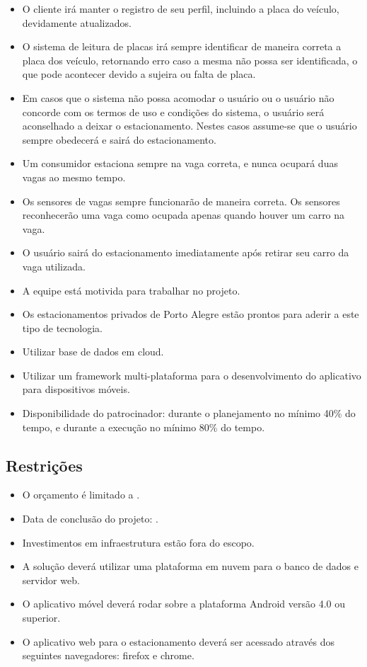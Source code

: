 \begin{itemize}
	\item O cliente irá manter o registro de seu perfil, incluindo a placa do veículo, devidamente atualizados.
    \item O sistema de leitura de placas irá sempre identificar de maneira correta a placa dos veículo, retornando erro caso a mesma não possa ser identificada, o que pode acontecer devido a sujeira ou falta de placa.
    \item Em casos que o sistema não possa acomodar o usuário ou o usuário não concorde com os termos de uso e condições do sistema, o usuário será aconselhado a deixar o estacionamento. Nestes casos assume-se que o usuário sempre obedecerá e sairá do estacionamento.
    \item Um consumidor estaciona sempre na vaga correta, e nunca ocupará duas vagas ao mesmo tempo.
    \item Os sensores de vagas sempre funcionarão de maneira correta. Os sensores reconhecerão uma vaga como ocupada apenas quando houver um carro na vaga.
    \item O usuário sairá do estacionamento imediatamente após retirar seu carro da vaga utilizada.
    \item A equipe está motivida para trabalhar no projeto.
	\item Os estacionamentos privados de Porto Alegre estão prontos para aderir a este tipo de tecnologia.
	\item Utilizar base de dados em cloud.
	\item Utilizar um framework multi-plataforma para o desenvolvimento do aplicativo para dispositivos móveis.
	\item Disponibilidade do patrocinador: durante o planejamento no mínimo 40\% do tempo, e durante a execução no mínimo 80\% do tempo.
\end{itemize}

\subsection{Restrições}

\begin{itemize}
	\item O orçamento é limitado a \maximumBudget{}.
	\item Data de conclusão do projeto: \maximumDeadline{}.
	\item Investimentos em infraestrutura estão fora do escopo.
	\item A solução deverá utilizar uma plataforma em nuvem para o banco de dados e servidor web.
	\item O aplicativo móvel deverá rodar sobre a plataforma Android versão 4.0 ou superior.
	\item O aplicativo web para o estacionamento deverá ser acessado através dos seguintes navegadores: firefox e chrome.
\end{itemize}

